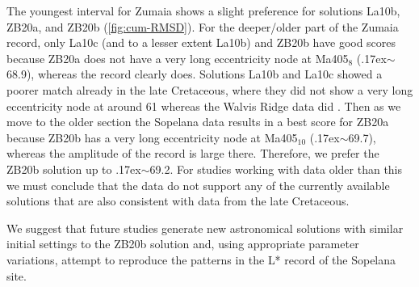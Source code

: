 \documentclass[draft]{agujournal2019}
\newcommand{\appr}{\raise.17ex\hbox{$\scriptstyle\sim$}} %
\newcommand{\ijk}{\textcolor{blue}}
\begin{document}
The youngest interval for Zumaia shows a slight preference for solutions La10b, ZB20a, and ZB20b (\cref{fig:cum-RMSD}).
For the deeper/older part of the Zumaia record, only La10c (and to a lesser extent La10b) and ZB20b have good scores because ZB20a does not have a very long eccentricity node at Ma405\(_{8}\) (\appr\qty{68.9}{\millionyearago}), whereas the record clearly does.
Solutions La10b and La10c showed a poorer match already in the late Cretaceous, where they did not show a very long eccentricity node at around \qty{61}{\millionyearago} whereas the Walvis Ridge data did \cite{ZeebeLourens2022EPSL}.
Then as we move to the older section the Sopelana data results in a best score for ZB20a because ZB20b has a very long eccentricity node at Ma405\(_{10}\) (\appr\qty{69.7}{\millionyearago}), whereas the amplitude of the record is large there.
Therefore, we prefer the ZB20b solution up to \appr\qty{69.2}{\millionyearago}.
For studies working with data older than this we must conclude that the data do not support any of the currently available solutions that are also consistent with data from the late Cretaceous.

We suggest that future studies generate new astronomical solutions with similar initial settings to the ZB20b solution and, using appropriate parameter variations, attempt to reproduce the patterns in the \gls{L*} record of the Sopelana site.




\end{document}
